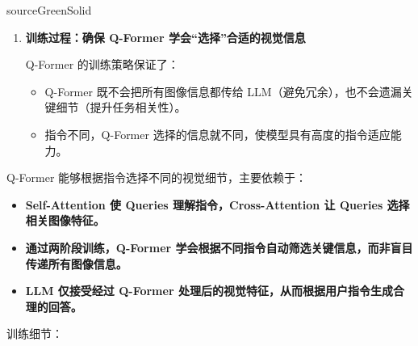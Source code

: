 \documentclass[zihao=false,fontset=windows]{ctexart}
\begin{document}
\begin{feishubox}{sourceGreenSolid}{🙋}
\begin{enumerate}
\begin{itemize}
\begin{itemize}
\item “它的眼睛是什么颜色？” → Queries 关注局部区域（眼睛）。

\item “背景里有什么？” → Queries 关注背景，而忽略主体。

\end{itemize}
\end{itemize}
\item[\textcolor{feishuBlue}{2.}] \textbf{训练过程：确保 Q-Former 学会“选择”合适的视觉信息}\par
Q-Former 的训练策略保证了：\par

\begin{itemize}
\item Q-Former 既不会把所有图像信息都传给 LLM（避免冗余），也不会遗漏关键细节（提升任务相关性）。

\item 指令不同，Q-Former 选择的信息就不同，使模型具有高度的指令适应能力。

\end{itemize}
\end{enumerate}
\textcolor{feishuBlue}{Q-Former 能够根据指令选择不同的视觉细节，主要依赖于：}\par

\begin{itemize}
\item \textcolor{feishuBlue}{\textbf{Self-Attention 使 Queries 理解指令，Cross-Attention 让 Queries 选择相关图像特征。}}

\item \textcolor{feishuBlue}{\textbf{通过两阶段训练，Q-Former 学会根据不同指令自动筛选关键信息，而非盲目传递所有图像信息。}}

\item \textcolor{feishuBlue}{\textbf{LLM 仅接受经过 Q-Former 处理后的视觉特征，从而根据用户指令生成合理的回答。}}

\end{itemize}
\end{feishubox}
训练细节：\par
\end{document}

